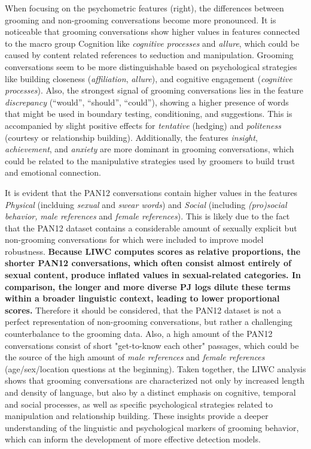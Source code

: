 When focusing on the psychometric features (right), the differences between grooming and non-grooming conversations become more pronounced. It is noticeable that grooming conversations show higher values in features connected to the macro group {Cognition} like \textit{cognitive processes} and \textit{allure}, which could be caused by content related references to seduction and manipulation. Grooming conversations seem to be more distinguishable based on psychological strategies like building closeness (\textit{affiliation}, \textit{allure}), and cognitive engagement (\textit{cognitive processes}). Also, the strongest signal of grooming conversations lies in the feature \textit{discrepancy} (“would”, “should”, “could”), showing a higher presence of words that might be used in boundary testing, conditioning, and suggestions. This is accompanied by slight positive effects for \textit{tentative} (hedging) and \textit{politeness} (courtesy or relationship building). Additionally, the features \textit{insight}, \textit{achievement}, and \textit{anxiety} are more dominant in grooming conversations, which could be related to the manipulative strategies used by groomers to build trust and emotional connection. 

It is evident that the PAN12 conversations contain higher values in the features \textit{Physical} (inclduing \textit{sexual} and \textit{swear words}) and \textit{Social} (including \textit{(pro)social behavior,}  \textit{male references} and \textit{female references}). This is likely due to the fact that the PAN12 dataset contains a considerable amount of sexually explicit but non-grooming conversations for which were included to improve model robustness. \textbf{Because LIWC computes scores as relative proportions, the shorter PAN12 conversations, which often consist almost entirely of sexual content, produce inflated values in sexual-related categories. In comparison, the longer and more diverse PJ logs dilute these terms within a broader linguistic context, leading to lower proportional scores.} Therefore it should be considered, that the PAN12 dataset is not a perfect representation of non-grooming conversations, but rather a challenging counterbalance to the grooming data. Also, a high amount of the PAN12 conversations consist of short "get-to-know each other" passages, which could be the source of the high amount of \textit{male references} and \textit{female references} (age/sex/location questions at the beginning). Taken together, the LIWC analysis shows that grooming conversations are characterized not only by increased length and density of language, but also by a distinct emphasis on cognitive, temporal and social processes, as well as specific psychological strategies related to manipulation and relationship building. These insights provide a deeper understanding of the linguistic and psychological markers of grooming behavior, which can inform the development of more effective detection models.

